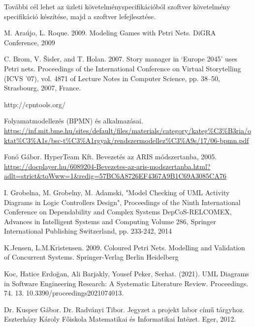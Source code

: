 \documentclass[12pt]{article}
\begin{document}
További cél lehet az üzleti követelményspecifikációból szoftver követelmény specifikáció készítése, majd a szoftver lefejlesztése.


%

\newpage
\renewcommand{\refname}{Irodalomjegyzék}
\begin{thebibliography}{99}

 M. Araújo, L. Roque. 2009. Modeling Games with Petri Nets. DiGRA Conference, 2009 

C. Brom, V. Šisler, and T. Holan. 2007. Story manager in ‘Europe 2045’ uses Petri nets. 
Proceedings of the International Conference on Virtual Storytelling (ICVS '07), vol. 4871 of 
Lecture Notes in Computer Science, pp. 38–50, Strasbourg, 2007, France.

http://cpntools.org/

Folyamatmodellezés (BPMN) és alkalmazásai.
\url{https://inf.mit.bme.hu/sites/default/files/materials/category/kateg%C3%B3ria/oktat%C3%A1s/bsc-t%C3%A1rgyak/rendszermodellez%C3%A9s/17/06-bpmn.pdf}

Fonó Gábor. HyperTeam Kft. Bevezetés az ARIS módszertanba, 2005.
\url{https://docplayer.hu/6089204-Bevezetes-az-aris-modszertanba.html?adlt=strict&toWww=1&redig=57BC6A8726EF4367A9B1C69A3085CA76}

 I. Grobelna, M. Grobelny, M. Adamski, "Model Checking of UML Activity Diagrams in Logic Controllers Design", Proceedings of the Ninth International Conference on Dependability and Complex Systems DepCoS-RELCOMEX, Advances in Intelligent Systems and Computing Volume 286, Springer International Publishing Switzerland, pp. 233-242, 2014

 K.Jensen, L.M.Kristensen. 2009. Coloured Petri Nets. Modelling and Validation of Concurrent Systems. Springer-Verlag Berlin Heidelberg

Koc, Hatice  Erdoğan, Ali  Barjakly, Yousef  Peker, Serhat. (2021). UML Diagrams in Software Engineering Research: A Systematic Literature Review. Proceedings. 74. 13. 10.3390/proceedings2021074013. 

Dr. Kusper Gábor.  Dr. Radványi Tibor. Jegyzet a projekt labor című tárgyhoz. Eszterházy Károly Főiskola Matematikai és Informatikai Intézet. Eger, 2012.


\end{thebibliography}
\end{document}
